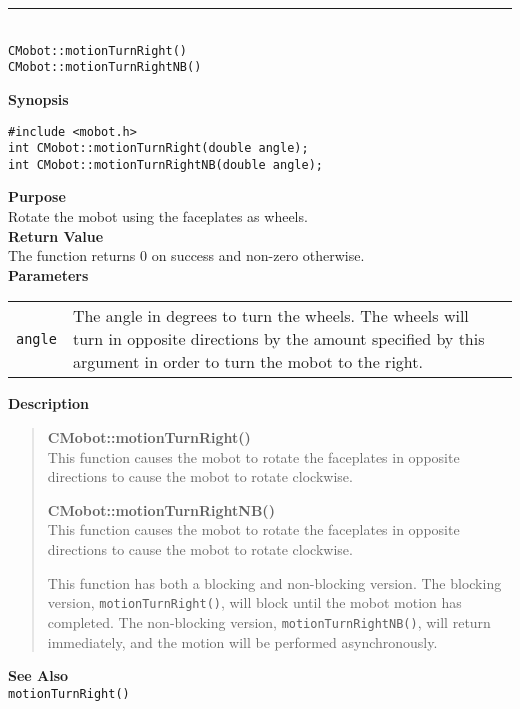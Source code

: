 \noindent
\vspace{5pt}
\rule{4.5in}{0.015in}\\
\noindent
{\LARGE \texttt{CMobot::motionTurnRight()}}\\
{\LARGE \texttt{CMobot::motionTurnRightNB()}}\\
{}

\noindent
{\bf Synopsis}
\vspace{-8pt}
\begin{verbatim}
#include <mobot.h>
int CMobot::motionTurnRight(double angle);
int CMobot::motionTurnRightNB(double angle);
\end{verbatim}

\noindent
{\bf Purpose}\\
Rotate the mobot using the faceplates as wheels.\\

\noindent
{\bf Return Value}\\
The function returns 0 on success and non-zero otherwise.\\

\noindent
{\bf Parameters}\\
\vspace{-0.1in}
\begin{description}
\item               
\begin{tabular}{p{10 mm}p{145 mm}}
\texttt{angle} & The angle in degrees to turn the wheels. The wheels will turn in opposite directions by the amount specified by this argument in order to turn the mobot to the right. \\
\end{tabular}
\end{description}

\noindent
{\bf Description}\\
\vspace{-12pt}
\begin{quote}
{\bf CMobot::motionTurnRight()}\\
This function causes the mobot to rotate the faceplates in opposite directions
to cause the mobot to rotate clockwise.

{\bf CMobot::motionTurnRightNB()}\\
This function causes the mobot to rotate the faceplates in opposite directions
to cause the mobot to rotate clockwise.

This function has both a blocking and non-blocking version.
The blocking version, \texttt{motionTurnRight()}, will block until the
mobot motion has completed. The non-blocking version, \texttt{motionTurnRightNB()},
will return immediately, and the motion will be performed asynchronously.\\
\end{quote}


\noindent
{\bf See Also}\\
\texttt{motionTurnRight()}

